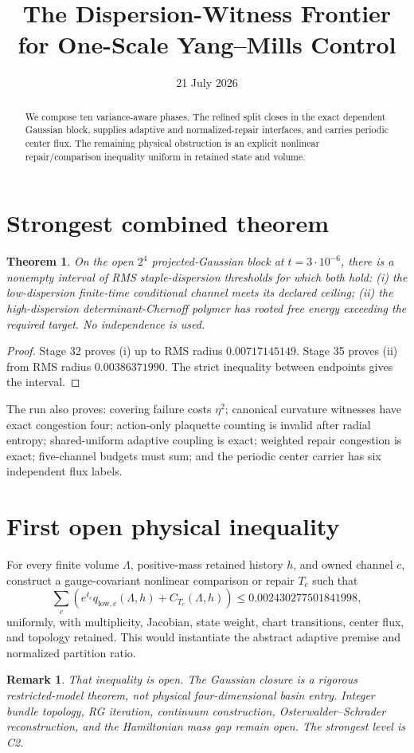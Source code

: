 \documentclass[11pt]{article}\usepackage[margin=1in]{geometry}\usepackage{amsmath,amsthm,booktabs}\newtheorem{theorem}{Theorem}\newtheorem{remark}{Remark}
\title{The Dispersion-Witness Frontier for One-Scale Yang--Mills Control}\author{}\date{21 July 2026}
\begin{document}
\maketitle
\begin{abstract}We compose ten variance-aware phases. The refined split closes in the exact dependent Gaussian block, supplies adaptive and normalized-repair interfaces, and carries periodic center flux. The remaining physical obstruction is an explicit nonlinear repair/comparison inequality uniform in retained state and volume.\end{abstract}
\section{Strongest combined theorem}
\begin{theorem}On the open $2^4$ projected-Gaussian block at $t=3\cdot10^{-6}$, there is a nonempty interval of RMS staple-dispersion thresholds for which both hold: (i) the low-dispersion finite-time conditional channel meets its declared ceiling; (ii) the high-dispersion determinant-Chernoff polymer has rooted free energy exceeding the required target. No independence is used.\end{theorem}
\begin{proof}Stage 32 proves (i) up to RMS radius $0.00717145149$. Stage 35 proves (ii) from RMS radius $0.00386371990$. The strict inequality between endpoints gives the interval.\end{proof}
The run also proves: covering failure costs $\eta^2$; canonical curvature witnesses have exact congestion four; action-only plaquette counting is invalid after radial entropy; shared-uniform adaptive coupling is exact; weighted repair congestion is exact; five-channel budgets must sum; and the periodic center carrier has six independent flux labels.
\section{First open physical inequality}
For every finite volume $\Lambda$, positive-mass retained history $h$, and owned channel $c$, construct a gauge-covariant nonlinear comparison or repair $T_c$ such that
\[\sum_c\left(e^{\ell_c}q_{\mathrm{low},c}(\Lambda,h)+C_{T_c}(\Lambda,h)\right)\le0.002430277501841998,
\]
uniformly, with multiplicity, Jacobian, state weight, chart transitions, center flux, and topology retained. This would instantiate the abstract adaptive premise and normalized partition ratio.
\begin{remark}That inequality is open. The Gaussian closure is a rigorous restricted-model theorem, not physical four-dimensional basin entry. Integer bundle topology, RG iteration, continuum construction, Osterwalder--Schrader reconstruction, and the Hamiltonian mass gap remain open. The strongest level is C2.\end{remark}
\end{document}
